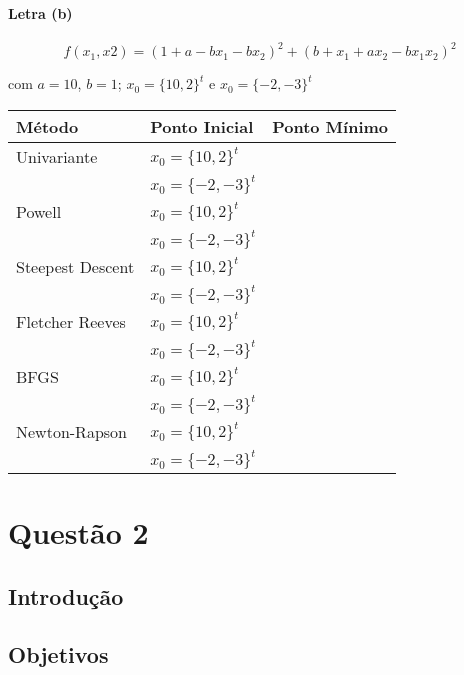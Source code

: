 \documentclass[12pt]{article}
\begin{document}
\paragraph*{Letra (b)}

\begin{equation}
  f(x_{1}, x{2}) = (1+a-bx_{1}-bx_{2})^{2}+(b+x_{1}+ax_{2}-bx_{1}x_{2})^{2}
\end{equation}

\noindent com $a=10$, $b=1$;  $x_{0}=\{10,2\}^{t}$ e $x_{0}=\{-2,-3\}^{t}$

\begin{table}[H]
  \centering
  \begin{tabular}{lll}
    \hline
    \textbf{Método} & \textbf{Ponto Inicial} & \textbf{Ponto Mínimo} \\\hline
    Univariante & $x_{0} =\{10,2\}^{t}$ & \\
     & $x_{0}=\{-2,-3\}^{t}$ & \\\hline 
    Powell & $x_{0} =\{10,2\}^{t}$ & \\
     & $x_{0}=\{-2,-3\}^{t}$ & \\\hline 
    Steepest Descent & $x_{0} =\{10,2\}^{t}$ & \\
     & $x_{0}=\{-2,-3\}^{t}$ & \\\hline 
    Fletcher Reeves & $x_{0} =\{10,2\}^{t}$ & \\
     & $x_{0}=\{-2,-3\}^{t}$ & \\\hline 
    BFGS & $x_{0} =\{10,2\}^{t}$ & \\
     & $x_{0}=\{-2,-3\}^{t}$ & \\\hline 
    Newton-Rapson & $x_{0} =\{10,2\}^{t}$ & \\
     & $x_{0}=\{-2,-3\}^{t}$ & \\\hline 
  \end{tabular}
\end{table}


\section*{Questão 2} 

\subsection*{Introdução}

\subsection*{Objetivos}
\end{document}

